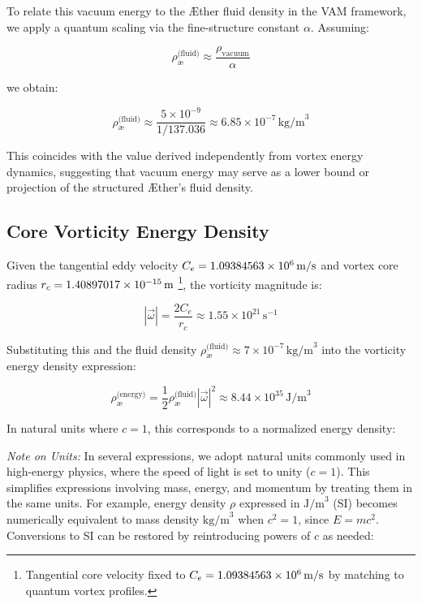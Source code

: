 \documentclass[12pt]{article}
\begin{document}
    To relate this vacuum energy to the \AE{}ther fluid density in the VAM framework, we apply a quantum scaling via the fine-structure constant \( \alpha \). Assuming:

    \[
        \rho_{\text{\ae}}^{\text{(fluid)}} \approx \frac{\rho_{\text{vacuum}}}{\alpha}
    \]

    we obtain:

    \[
        \rho_{\text{\ae}}^{\text{(fluid)}} \approx \frac{5 \times 10^{-9}}{1/137.036} \approx 6.85 \times 10^{-7} \, \text{kg/m}^3
    \]

    This coincides with the value derived independently from vortex energy dynamics, suggesting that vacuum energy may serve as a lower bound or projection of the structured \AE{}ther's fluid density.

    \subsection{Core Vorticity Energy Density}

    Given the tangential eddy velocity $C_e = 1.09384563 \times 10^{6} \, \text{m/s}$ and vortex core radius $r_c = 1.40897017 \times 10^{-15} \, \text{m}$ \footnote{Tangential core velocity fixed to \( C_e = 1.09384563 \times 10^{6}  \, \text{m/s} \) by matching to quantum vortex profiles.}, the vorticity magnitude is:

    \[
        |\vec{\omega}| = \frac{2 C_e}{r_c} \approx 1.55 \times 10^{21} \, \text{s}^{-1}
    \]

    Substituting this and the fluid density $\rho_{\text{\ae}}^{\text{(fluid)}} \approx 7 \times 10^{-7} \, \text{kg/m}^3$ into the vorticity energy density expression:

    \[
        \rho_{\text{\ae}}^{\text{(energy)}} = \frac{1}{2} \rho_{\text{\ae}}^{\text{(fluid)}} |\vec{\omega}|^2 \approx 8.44 \times 10^{35} \, \text{J/m}^3
    \]

    In natural units where $c = 1$, this corresponds to a normalized energy density:

    \textit{Note on Units:} In several expressions, we adopt natural units commonly used in high-energy physics, where the speed of light is set to unity ($c=1$). This simplifies expressions involving mass, energy, and momentum by treating them in the same units. For example, energy density $\rho$ expressed in $\text{J/m}^3$ (SI) becomes numerically equivalent to mass density $\text{kg/m}^3$ when $c^2 = 1$, since $E = mc^2$. Conversions to SI can be restored by reintroducing powers of $c$ as needed:
\end{document}
